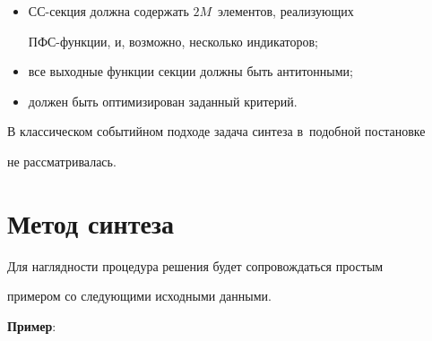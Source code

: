 \pagebreak





\noindent


   \begin{itemize}


   \item СС-секция должна содержать $2M$~элементов, реализующих  


ПФС-функ\-ции, и, возможно, несколько индикаторов;\\[-14pt]


   \item все выходные функции секции должны быть антитонными;\\[-14pt]


   \item должен быть оптимизирован заданный критерий.


   \end{itemize}


   


   В классическом событийном подходе задача синтеза в~подобной постановке 


не рассматривалась.








\vspace*{-3pt}





\section{Метод синтеза}


       


       \vspace*{-3pt}


       


   Для наглядности процедура решения будет сопровождаться простым 


примером со следующими исходными данными.


   


   \noindent


   \textbf{Пример}:


